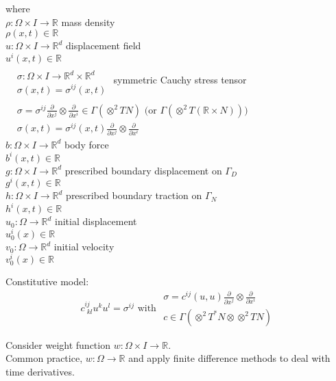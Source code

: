 \documentclass[twoside,landscape,10pt]{amsart}
\theoremstyle{plain}
\theoremstyle{definition}
\theoremstyle{remark}
\begin{document}
\begin{multicols*}{2}
where \\
$\rho : \Omega \times I \to \mathbb{R}$ mass density \\
$\rho(x,t) \in \mathbb{R}$ \\
$u:\Omega \times I \to \mathbb{R}^d$ displacement field \\
$u^i(x,t) \in \mathbb{R}$ \\
$\begin{aligned} & \quad \\ 
  & \sigma : \Omega \times I \to \mathbb{R}^d \times \mathbb{R}^d \\
  & \sigma(x,t) = \sigma^{ij}(x,t) \end{aligned}$ symmetric Cauchy stress tensor \quad \quad \quad \, $\begin{aligned} & \quad \\ 
  & \sigma = \sigma^{ij} \frac{ \partial }{ \partial x^j} \otimes \frac{ \partial }{ \partial x^i } \in \Gamma(\otimes^2 TN) \text{ (or $\Gamma(\otimes^2 T(\mathbb{R}\times N))$)} \\
  & \sigma(x,t) = \sigma^{ij}(x,t) \frac{ \partial }{ \partial x^j} \otimes \frac{ \partial }{ \partial x^i} \end{aligned}$ \\
$b: \Omega \times I \to \mathbb{R}^d$ body force \\
$b^i(x,t) \in \mathbb{R}$ \\
$g: \Omega \times I \to \mathbb{R}^d$ prescribed boundary displacement on $\Gamma_D$ \\
$g^i(x,t) \in \mathbb{R}$ \\
$h: \Omega \times I \to \mathbb{R}^d$ prescribed boundary traction on $\Gamma_N$ \\
$h^i(x,t) \in \mathbb{R}$ \\
$u_0 : \Omega \to \mathbb{R}^d$ initial displacement \\
$u_0^i(x) \in \mathbb{R}$ \\
$v_0 : \Omega \to \mathbb{R}^d$ initial velocity \\
$v_0^i(x) \in \mathbb{R}$ 

Constitutive model: 
\[
c^{ij}_{\,\,kl} u^ku^l = \sigma^{ij} \text{ with } \begin{aligned} \sigma = c^{ij}(u,u) \frac{ \partial }{ \partial x^j} \otimes \frac{ \partial }{ \partial x^i } \\
  c\in \Gamma(\otimes^2 T^*N \otimes \otimes^2TN) \end{aligned}
\]

Consider weight function $w: \Omega \times I \to \mathbb{R}$.   \\
Common practice, $w: \Omega \to \mathbb{R}$ and apply finite difference methods to deal with time derivatives.  


\end{multicols*}
\end{document}
